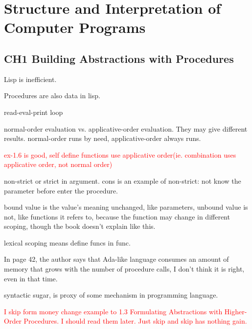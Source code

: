%
%
%

\chapter{Structure and Interpretation of Computer Programs}
\label{intro} %


\section{CH1 Building Abstractions with Procedures}
\label{sec:1}

Lisp is inefficient.

Procedures are also data in lisp.

read-eval-print loop

normal-order evaluation vs. applicative-order evaluation. They may give different results. normal-order runs by need, applicative-order always runs.

\textcolor{red}{ex-1.6 is good, self define functions use applicative order(ie. combination uses applicative order, not normal order)}

non-strict or strict in argument. cons is an example of non-strict: not know the parameter before enter the procedure.

bound value is the value's meaning unchanged, like parameters, unbound value is not, like functions it refers to, because the function may change in different scoping, though the book doesn't explain like this.

lexical scoping means define funcs in func.

In page 42, the author says that Ada-like language consumes an amount of memory that grows with the number of procedure calls, I don't think it is right, even in that time.

syntactic sugar, is proxy of some mechanism in programming language.

\textcolor{red}{I skip form money change example to 1.3 Formulating Abstractions with Higher-Order Procedures. I should read them later. Just skip and skip has nothing gain.}

